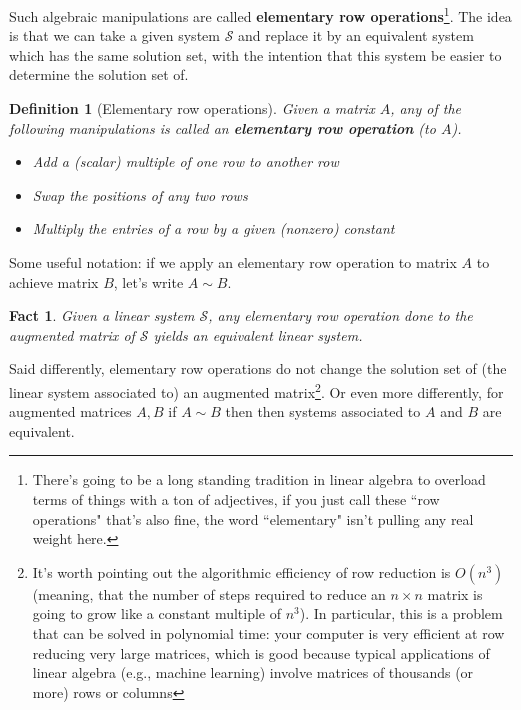 \documentclass[12pt]{article}
\numberwithin{equation}{subsection}
\numberwithin{figure}{subsection}
\newtheorem{defn}[subsection]{Definition}
\newtheorem{fact}[subsection]{Fact}
\theoremstyle{note}
\begin{document}
Such algebraic manipulations are called  \textbf{elementary row operations}\footnote{There's going to be a long standing tradition in linear algebra to overload terms of things with a ton of adjectives, if you just call these ``row operations" that's also fine, the word ``elementary" isn't pulling any real weight here.}. The idea is that we can take a given system $\mathcal{S}$ and replace it by an equivalent system which has the same solution set, with the intention that this system be easier to determine the solution set of. 

\begin{defn}[Elementary row operations] Given a matrix $A$, any of the following manipulations is called an \textbf{elementary row operation} (to $A$). 

\begin{itemize}
	\item Add a (scalar) multiple of one row to another row
	\item Swap the positions of any two rows
	\item Multiply the entries of a row by a given (nonzero) constant
\end{itemize}
\end{defn}

Some useful notation: if we apply an elementary row operation to matrix $A$ to achieve matrix $B$, let's write $A\sim B$. 
\begin{fact}
	Given a linear system $\mathcal{S}$, any elementary row operation done to the augmented matrix of $\mathcal{S}$ yields an equivalent linear system.
\end{fact}
Said differently, elementary row operations do not change the solution set of (the linear system associated to) an augmented matrix\footnote{It's worth pointing out the algorithmic efficiency of row reduction is $O(n^3)$ (meaning, that the number of steps required to reduce an $n\times n$ matrix is going to grow like a constant multiple of $n^3$). In particular, this is a problem that can be solved in polynomial time: your computer is very efficient at row reducing very large matrices, which is good because typical applications of linear algebra (e.g., machine learning) involve matrices of thousands (or more) rows or columns}. Or even more differently, for augmented matrices $A,B$ if $A\sim B$ then then systems associated to $A$ and $B$ are equivalent. 
\end{document}
